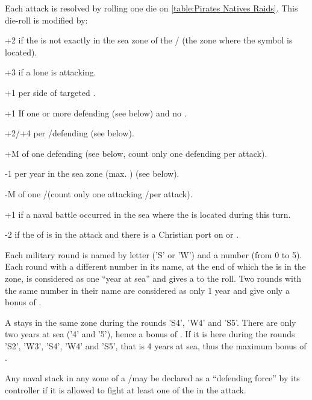\bparag Each attack is resolved by rolling one die on \ref{table:Pirates
  Natives Raids}. This die-roll is modified by:
\begin{modlist}
\item[+2] if the \corsaire is not exactly in the sea zone of the \STZ/\CTZ
  (the zone where the symbol is located).
\item[+3] if a lone \corsaire\facemoins is attacking.
\item[+1] per side of targeted \TradeFLEET.
\item[+1] If one or more \ND defending (see below) and no \FLEET.
\item[+2/+4] per \FLEET\facemoins/\Faceplus defending (see below).
\item[+M] \Man of one defending \LeaderA (see below, count only one defending
  \LeaderA per attack).
\item[-1] per year in the sea zone (max. ) (see below).
\item[-M] \Man of one \corsaire \LeaderA/\LeaderP (count only one attacking
  \LeaderA/\LeaderP per attack). %
\item[+1] if a naval battle occurred in the sea where the \corsaire is located
  during this turn. %
\item[-2] if the \corsaire of  is in the attack and there is
  a Christian port on  or \seazoneLevantin.
\end{modlist}

\bparag Each military round is named by letter ('S' or 'W') and a number (from
0 to 5).
\bparag Each round with a different number in its name, at the end of which
the \corsaire is in the zone, is considered as one ``year at sea'' and gives a
 to the roll.
\bparag Two rounds with the same number in their name are considered as only 1
year and give only a bonus of .
\begin{exemple}
  A \corsaire stays in the same zone during the rounds 'S4', 'W4' and
  'S5'. There are only two years at sea ('4' and '5'), hence a bonus of
  . If it is here during the rounds 'S2', 'W3', 'S4', 'W4' and 'S5',
  that is 4 years at sea, thus the maximum bonus of .
\end{exemple}

 Any naval stack in any zone of a \STZ/\CTZ may
be declared as a ``defending force'' by its controller if it is allowed to
fight at least one of the \corsaire in the attack.


